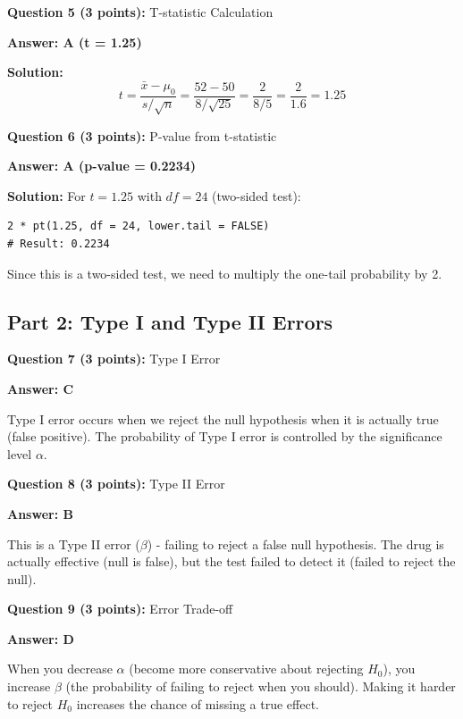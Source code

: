 \documentclass[11pt]{article}
\begin{document}
\textbf{Question 5 (3 points):} T-statistic Calculation

\textcolor{correctgreen}{\textbf{Answer: A (t = 1.25)}}

\textbf{Solution:}
$$t = \frac{\bar{x} - \mu_0}{s/\sqrt{n}} = \frac{52 - 50}{8/\sqrt{25}} = \frac{2}{8/5} = \frac{2}{1.6} = 1.25$$

\vspace{0.5cm}

\textbf{Question 6 (3 points):} P-value from t-statistic

\textcolor{correctgreen}{\textbf{Answer: A (p-value = 0.2234)}}

\textbf{Solution:}
For $t = 1.25$ with $df = 24$ (two-sided test):
\begin{verbatim}
2 * pt(1.25, df = 24, lower.tail = FALSE)
# Result: 0.2234
\end{verbatim}

Since this is a two-sided test, we need to multiply the one-tail probability by 2.

\newpage

\subsection*{Part 2: Type I and Type II Errors}

\textbf{Question 7 (3 points):} Type I Error

\textcolor{correctgreen}{\textbf{Answer: C}}

Type I error occurs when we reject the null hypothesis when it is actually true (false positive). The probability of Type I error is controlled by the significance level $\alpha$.

\vspace{0.5cm}

\textbf{Question 8 (3 points):} Type II Error

\textcolor{correctgreen}{\textbf{Answer: B}}

This is a Type II error ($\beta$) - failing to reject a false null hypothesis. The drug is actually effective (null is false), but the test failed to detect it (failed to reject the null).

\vspace{0.5cm}

\textbf{Question 9 (3 points):} Error Trade-off

\textcolor{correctgreen}{\textbf{Answer: D}}

When you decrease $\alpha$ (become more conservative about rejecting $H_0$), you increase $\beta$ (the probability of failing to reject when you should). Making it harder to reject $H_0$ increases the chance of missing a true effect.
\end{document}

